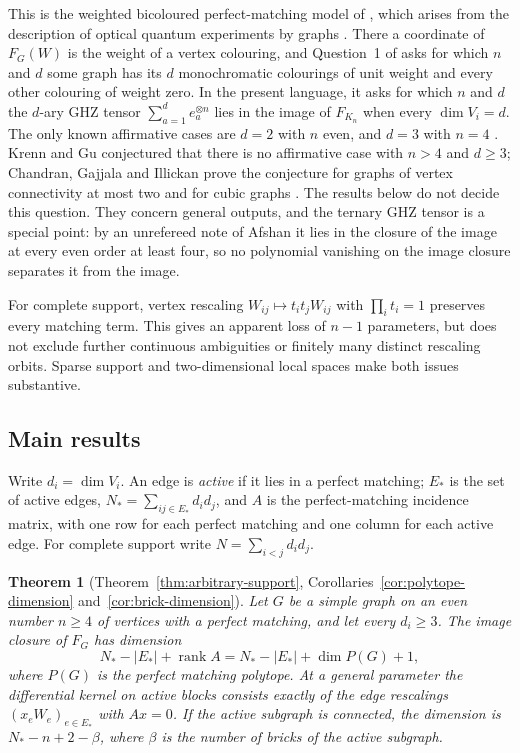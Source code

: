 \documentclass[11pt]{article}
\newtheorem{introthm}{Theorem}
\theoremstyle{remark}\newtheorem{remark}[theorem]{Remark}
\DeclareMathOperator{\rank}{rank}
\begin{document}
This is the weighted bicoloured perfect-matching model of \cite[Definitions 2.1--2.3]{kgs}, which arises from the description of optical quantum experiments by graphs \cite{kgz,gu,gu-three}. There a coordinate of $F_G(W)$ is the weight of a vertex colouring, and Question~1 of \cite{kgs} asks for which $n$ and $d$ some graph has its $d$ monochromatic colourings of unit weight and every other colouring of weight zero. In the present language, it asks for which $n$ and $d$ the $d$-ary GHZ tensor $\sum_{a=1}^de_a^{\otimes n}$ lies in the image of $F_{K_n}$ when every $\dim V_i=d$. The only known affirmative cases are $d=2$ with $n$ even, and $d=3$ with $n=4$ \cite{kgs}. Krenn and Gu conjectured that there is no affirmative case with $n>4$ and $d\geq3$; Chandran, Gajjala and Illickan prove the conjecture for graphs of vertex connectivity at most two and for cubic graphs \cite{cgi}. The results below do not decide this question. They concern general outputs, and the ternary GHZ tensor is a special point: by an unrefereed note of Afshan \cite{closure} it lies in the closure of the image at every even order at least four, so no polynomial vanishing on the image closure separates it from the image.

For complete support, vertex rescaling $W_{ij}\mapsto t_it_jW_{ij}$ with $\prod_i t_i=1$ preserves every matching term. This gives an apparent loss of $n-1$ parameters, but does not exclude further continuous ambiguities or finitely many distinct rescaling orbits. Sparse support and two-dimensional local spaces make both issues substantive.

\subsection*{Main results}
Write $d_i=\dim V_i$. An edge is \emph{active} if it lies in a perfect matching; $E_*$ is the set of active edges, $N_*=\sum_{ij\in E_*}d_id_j$, and $A$ is the perfect-matching incidence matrix, with one row for each perfect matching and one column for each active edge. For complete support write $N=\sum_{i<j}d_id_j$.

\begin{introthm}[Theorem~\ref{thm:arbitrary-support}, Corollaries~\ref{cor:polytope-dimension} and~\ref{cor:brick-dimension}]
Let $G$ be a simple graph on an even number $n\geq4$ of vertices with a perfect matching, and let every $d_i\geq3$. The image closure of $F_G$ has dimension
\[
 N_*-|E_*|+\rank A=N_*-|E_*|+\dim P(G)+1,
\]
where $P(G)$ is the perfect matching polytope. At a general parameter the differential kernel on active blocks consists exactly of the edge rescalings $(x_eW_e)_{e\in E_*}$ with $Ax=0$. If the active subgraph is connected, the dimension is $N_*-n+2-\beta$, where $\beta$ is the number of bricks of the active subgraph.
\end{introthm}
\end{document}
